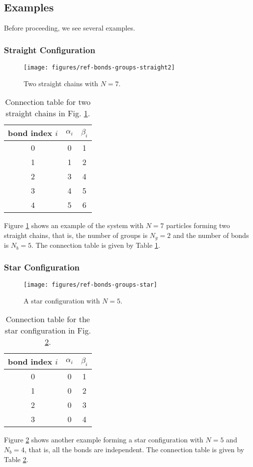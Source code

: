 \subsection{Examples}
Before proceeding, we see several examples.

\subsubsection{Straight Configuration}
\begin{figure}
  \centering
  \texttt{[image: figures/ref-bonds-groups-straight2]}
  \caption{
    Two straight chains with $N=7$.
  }
  \label{fig:ref-bonds-groups-straight2}
\end{figure}
\begin{table}[!htb]
  \begin{tabular}{ccc}
    bond index $i$ & $\alpha_{i}$ & $\beta_{i}$ \\
    \hline
    0 & 0 & 1 \\
    1 & 1 & 2 \\
    2 & 3 & 4 \\
    3 & 4 & 5 \\
    4 & 5 & 6
  \end{tabular}
  \caption{%
    Connection table for two straight chains 
    in Fig. \ref{fig:ref-bonds-groups-straight2}.
  }
  \label{tab:ref-bonds-groups-straight2}
\end{table}
Figure \ref{fig:ref-bonds-groups-straight2} shows an example of the system 
with $N=7$ particles forming two straight chains, that is, 
the number of groups is $N_{g} = 2$ and 
the number of bonds is $N_{b} = 5$. 
The connection table is given by Table \ref{tab:ref-bonds-groups-straight2}. 

\subsubsection{Star Configuration}
\begin{figure}
  \centering
  \texttt{[image: figures/ref-bonds-groups-star]}
  \caption{
    A star configuration with $N=5$.
  }
  \label{fig:ref-bonds-groups-star}
\end{figure}
\begin{table}[!htb]
  \begin{tabular}{ccc}
    bond index $i$ & $\alpha_{i}$ & $\beta_{i}$ \\
    \hline
    0 & 0 & 1 \\
    1 & 0 & 2 \\
    2 & 0 & 3 \\
    3 & 0 & 4
  \end{tabular}
  \caption{%
    Connection table for the star configuration 
    in Fig. \ref{fig:ref-bonds-groups-star}.
  }
  \label{tab:ref-bonds-groups-star}
\end{table}
Figure \ref{fig:ref-bonds-groups-star} shows another example 
forming a star configuration with $N=5$ and $N_{b} = 4$, 
that is, all the bonds are independent. 
The connection table is given by Table \ref{tab:ref-bonds-groups-star}. 



